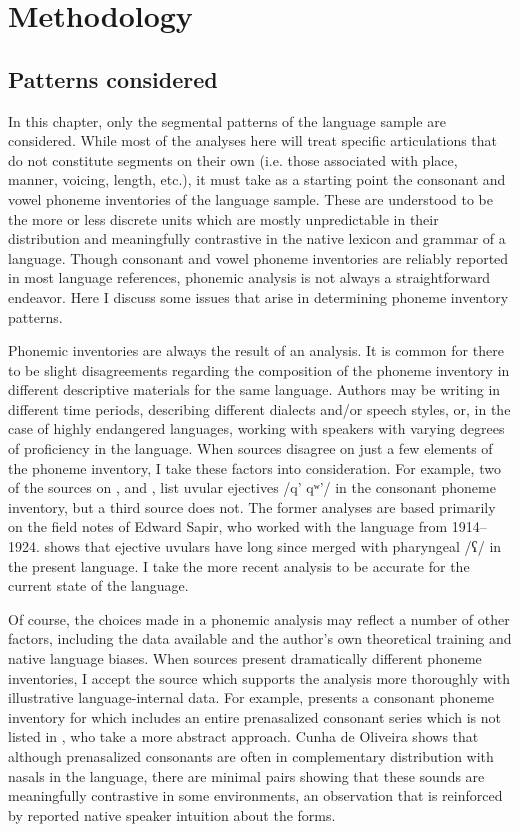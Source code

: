 \section{Methodology}\label{sec:4.2}
\subsection{Patterns considered}\label{sec:4.2.1}

  In this chapter, only the segmental patterns of the language sample are considered. While most of the analyses here will treat specific articulations that do not constitute segments on their own (i.e. those associated with place, manner, voicing, length, etc.), it must take as a starting point the consonant and vowel phoneme inventories of the language sample. These are understood to be the more or less discrete units which are mostly unpredictable in their distribution and meaningfully contrastive in the native lexicon and grammar of a language. Though consonant and vowel phoneme inventories are reliably reported in most language references, phonemic analysis is not always a straightforward endeavor. Here I discuss some issues that arise in determining phoneme inventory patterns.

  Phonemic inventories are always the result of an analysis. It is common for there to be slight disagreements regarding the composition of the phoneme inventory in different descriptive materials for the same language. Authors may be writing in different time periods, describing different dialects and/or speech styles, or, in the case of highly endangered languages, working with speakers with varying degrees of proficiency in the language. When sources disagree on just a few elements of the phoneme inventory, I take these factors into consideration. For example, two of the sources on , \citet{Stonham1999} and \citet{Davidson2002}, list uvular ejectives /q’ qʷ’/ in the consonant phoneme inventory, but a third source \citep{Kim2003} does not. The former analyses are based primarily on the field notes of Edward Sapir, who worked with the language from 1914--1924. \citet{Kim2003} shows that ejective uvulars have long since merged with pharyngeal /ʕ/ in the present language. I take the more recent analysis to be accurate for the current state of the language. 

  Of course, the choices made in a phonemic analysis may reflect a number of other factors, including the data available and the author’s own theoretical training and native language biases. When sources present dramatically different phoneme inventories, I accept the source which supports the analysis more thoroughly with illustrative language-internal data. For example, \citet{CunhadeOliveira2005} presents a consonant phoneme inventory for  which includes an entire prenasalized consonant series which is not listed in \citet{BurgessHam1968}, who take a more abstract approach. Cunha de Oliveira shows that although prenasalized consonants are often in complementary distribution with nasals in the language, there are minimal pairs showing that these sounds are meaningfully contrastive in some environments, an observation that is reinforced by reported native speaker intuition about the forms.

